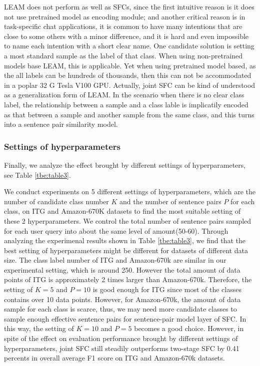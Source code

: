 \documentclass[letterpaper]{article} %
\begin{document}
  LEAM  does not perform as well as SFCs, since the first intuitive reason is it
  does  not use pretrained model as encoding module; and another critical reason
  is  in  task-specific  chat applications, it is common to have many intentions
  that are close to some others with a minor difference, and it is hard and even
  impossible  to  name  each  intention  with  a short clear name. One candidate
  solution  is  setting  a most standard sample as the label of that class. When
  using  non-pretrained  models  base  LEAM,  this is applicable. Yet when using
  pretrained  model  based, as the all labels can be hundreds of thousands, then
  this  can not be accommodated in a poplar 32 G Tesla V100 GPU. Actually, joint
  SFC  can  be  kind  of  understood  as  a  generalization form of LEAM. In the
  scenario when there is no clear class label, the relationship between a sample
  and  a class lable is implicatily encoded as that between a sample and another
  sample  from  the  same  class, and this turns into a sentence pair similarity
  model.

  \subsubsection*{Settings  of  hyperparameters} 
  Finally, we analyze the effect brought
  by  different  settings  of  hyperparameters,  see  Table \ref{tbe:table3}. 

  We  conduct  experiments on 5 different settings of hyperparameters, which are
  the  number of candidate class number $K$ and the number of sentence pairs $P$
  for  each  class,  on  ITG  and Amazon-670K datasets to find the most suitable
  setting  of  these  2 hyperparameters. We control the total number of sentence
  pairs  sampled for each user query into about the same level of amount(50-60).
  Through  analyzing the experimenal results shown in Table \ref{tbe:table3}, we
  find  that the best setting of hyperparameters might be different for datasets
  of  different  data  size.  The  class label number of ITG and Amazon-670k are
  similar  in  our  experimental setting, which is around 250. However the total
  amount of data points of ITG is approximately 2 times larger than Amazon-670k.
  Therefore,  the  setting of $K=5$ and $P=10$ is good enough for ITG since most
  of  the  classes  contains  over 10 data points. However, for Amazon-670k, the
  amount  of  data  sample  for  each  class  is  scarce, thus, we may need more
  candidate  classes to sample enough effective sentence pairs for sentence-pair
  model  layer  of  SFC.  In this way, the setting of $K=10$ and $P=5$ becomes a
  good choice. However, in spite of the effect on evaluation performance brought
  by different settings of hyperparameters, joint SFC still steadily outperforms
  two-stage  SFC  by  0.41  percents  in  overall  average  F1 score  on  ITG and
  Amazon-670k datasets.
\end{document}
